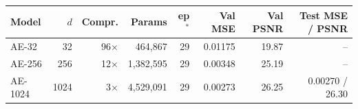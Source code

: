 \begin{tabular}{lrrrrrrr}
\toprule
Model & $d$ & Compr. & Params & ep$^*$ & Val MSE & Val PSNR & Test MSE / PSNR \\
\midrule
AE-32 & 32 & 96$\times$ & 464,867 & 29 & 0.01175 & 19.87 & -- \\
AE-256 & 256 & 12$\times$ & 1,382,595 & 29 & 0.00348 & 25.19 & -- \\
AE-1024 & 1024 & 3$\times$ & 4,529,091 & 29 & 0.00273 & 26.25 & 0.00270 / 26.30 \\
\bottomrule
\end{tabular}
